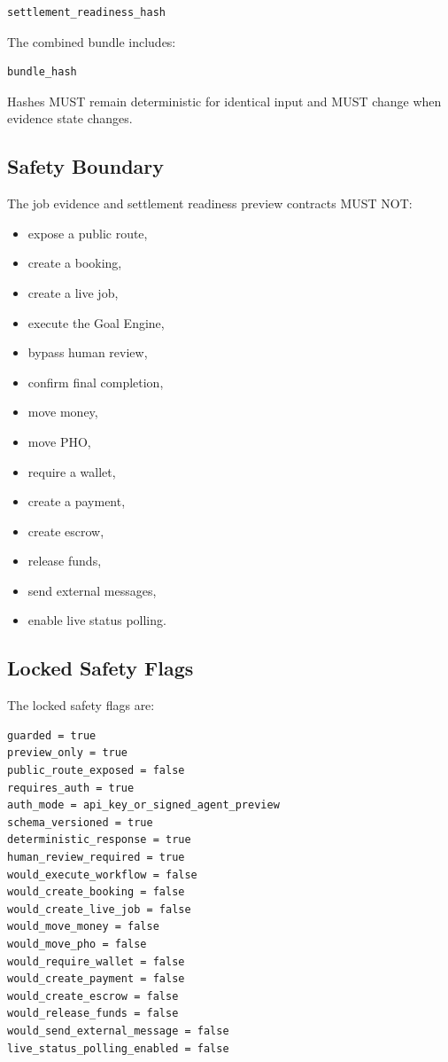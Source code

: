 \begin{verbatim}
settlement_readiness_hash
\end{verbatim}

The combined bundle includes:

\begin{verbatim}
bundle_hash
\end{verbatim}

Hashes MUST remain deterministic for identical input and MUST change when evidence state changes.

\subsection{Safety Boundary}

The job evidence and settlement readiness preview contracts MUST NOT:

\begin{itemize}
  \item expose a public route,
  \item create a booking,
  \item create a live job,
  \item execute the Goal Engine,
  \item bypass human review,
  \item confirm final completion,
  \item move money,
  \item move PHO,
  \item require a wallet,
  \item create a payment,
  \item create escrow,
  \item release funds,
  \item send external messages,
  \item enable live status polling.
\end{itemize}

\subsection{Locked Safety Flags}

The locked safety flags are:

\begin{verbatim}
guarded = true
preview_only = true
public_route_exposed = false
requires_auth = true
auth_mode = api_key_or_signed_agent_preview
schema_versioned = true
deterministic_response = true
human_review_required = true
would_execute_workflow = false
would_create_booking = false
would_create_live_job = false
would_move_money = false
would_move_pho = false
would_require_wallet = false
would_create_payment = false
would_create_escrow = false
would_release_funds = false
would_send_external_message = false
live_status_polling_enabled = false
\end{verbatim}

